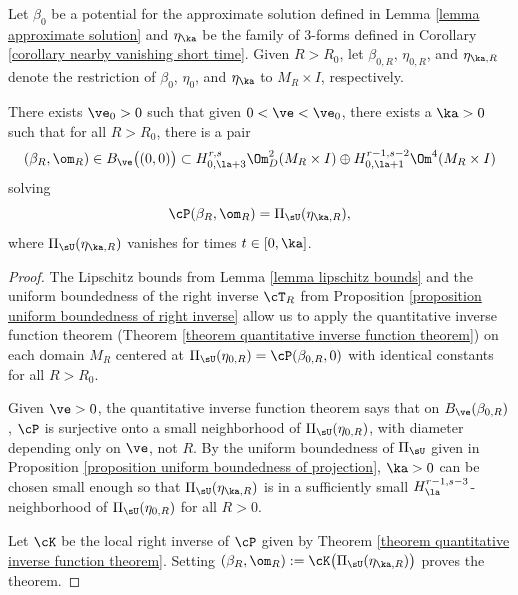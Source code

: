 \documentclass[hidelinks, 12pt, oneside, reqno]{amsart}
\begin{document}
\begin{thm}\label{theorem existence of inverse on domains}
    Let $\beta_0$ be a potential for the approximate solution defined in Lemma \ref{lemma approximate solution} and $\eta_\ka$ be the family of 3-forms defined in Corollary \ref{corollary nearby vanishing short time}. Given $R > R_0$, let $\beta_{0,R}$, $\eta_{0,R}$, and $\eta_{\ka,R}$ denote the restriction of $\beta_0$, $\eta_0$, and $\eta_\ka$ to $M_R \times I$, respectively.
    
    There exists $\ve_0 > 0$ such that given $0 < \ve < \ve_0$, there exists a $\ka > 0$ such that for all $R > R_0$, there is a pair 
    \[
    (\beta_{R}, \om_R) \in B_{\ve}\big((0,0)\big) \subset H^{r,s}_{0,\la+3}\Om^2_D(M_R \times I) \oplus H^{r-1,s-2}_{0,\la+1}\Om^4(M_R \times I)
    \]
    solving
    \[
    \cP(\beta_{R},\om_R) = \Pi_{\sU}(\eta_{\ka,R}),
    \]
    where $\Pi_{\sU}(\eta_{\ka,R})$ vanishes for times $t \in [0,\ka]$.
\end{thm}

\begin{proof}
The Lipschitz bounds from Lemma \ref{lemma lipschitz bounds} and the uniform boundedness of the right inverse $\cT_R$ from Proposition \ref{proposition uniform boundedness of right inverse} allow us to apply the quantitative inverse function theorem (Theorem \ref{theorem quantitative inverse function theorem}) on each domain $M_R$ centered at $\Pi_{\sU}(\eta_{0,R}) = \cP(\beta_{0,R},0)$ with identical constants for all $R > R_0$. 

Given $\ve >0$, the quantitative inverse function theorem says that on $B_{\ve}(\beta_{0,R})$, $\cP$ is surjective onto a small neighborhood of $\Pi_{\sU}(\eta_{0,R})$, with diameter depending only on $\ve$, not $R$. By the uniform boundedness of $\Pi_{\sU}$ given in Proposition \ref{proposition uniform boundedness of projection}, $\ka>0$ can be chosen small enough so that $\Pi_{\sU}(\eta_{\ka,R})$ is in a sufficiently small $H^{r-1,s-3}_{\la}$-neighborhood of $\Pi_{\sU}(\eta_{0,R})$ for all $R>0$.

Let $\cK$ be the local right inverse of $\cP$ given by Theorem \ref{theorem quantitative inverse function theorem}. Setting $(\beta_{R},\om_{R}) := \cK\big(\Pi_{\sU}(\eta_{\ka,R})\big)$ proves the theorem.
\end{proof}
\end{document}
